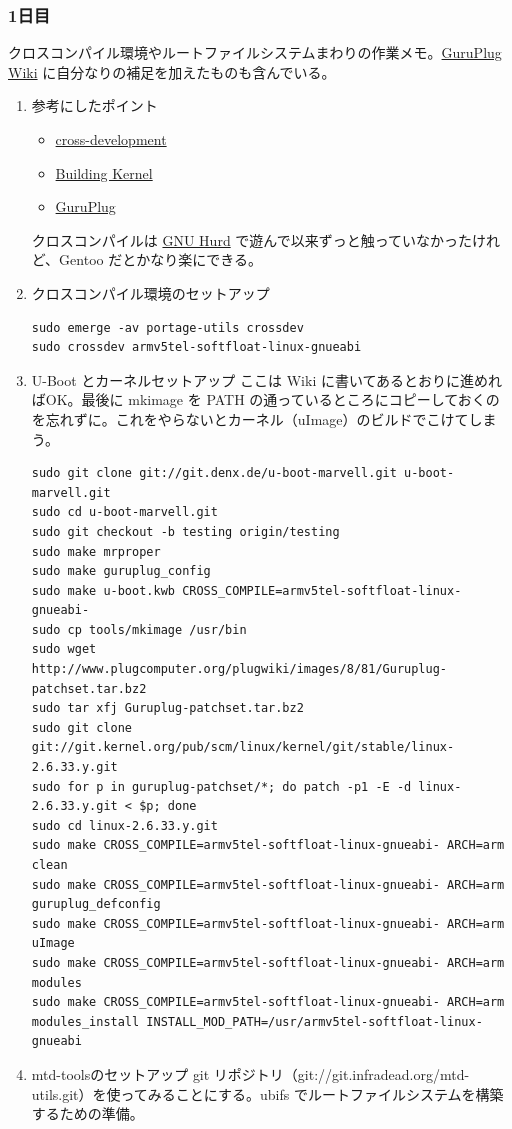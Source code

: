 \documentclass[11pt]{article}
\begin{document}
\subsubsection{1日目}
\label{sec:org42f26f9}
クロスコンパイル環境やルートファイルシステムまわりの作業メモ。\href{http://www.plugcomputer.org/plugwiki/index.php/GuruPlug\%22}{GuruPlug Wiki} に自分なりの補足を加えたものも含んでいる。
\begin{enumerate}
\item 参考にしたポイント
\label{sec:org939e62a}
\begin{itemize}
\item \href{http://www.gentoo.org/proj/en/base/embedded/cross-development.xml}{cross-development}
\item \href{http://computingplugs.com/index.php/Building\_a\_custom\_kernel}{Building
Kernel}
\item \href{http://www.plugcomputer.org/plugwiki/index.php/GuruPlug}{GuruPlug}
\end{itemize}

クロスコンパイルは \href{http://www.gnu.org/software/hurd/}{GNU Hurd} で遊んで以来ずっと触っていなかったけれど、Gentoo だとかなり楽にできる。
\item クロスコンパイル環境のセットアップ
\label{sec:orge3e42d4}
\begin{verbatim}
sudo emerge -av portage-utils crossdev
sudo crossdev armv5tel-softfloat-linux-gnueabi
\end{verbatim}
\item U-Boot とカーネルセットアップ
\label{sec:org1762c8f}
ここは Wiki に書いてあるとおりに進めればOK。最後に mkimage を PATH の通っているところにコピーしておくのを忘れずに。これをやらないとカーネル（uImage）のビルドでこけてしまう。

\begin{verbatim}
sudo git clone git://git.denx.de/u-boot-marvell.git u-boot-marvell.git
sudo cd u-boot-marvell.git
sudo git checkout -b testing origin/testing
sudo make mrproper
sudo make guruplug_config
sudo make u-boot.kwb CROSS_COMPILE=armv5tel-softfloat-linux-gnueabi-
sudo cp tools/mkimage /usr/bin
sudo wget http://www.plugcomputer.org/plugwiki/images/8/81/Guruplug-patchset.tar.bz2
sudo tar xfj Guruplug-patchset.tar.bz2
sudo git clone git://git.kernel.org/pub/scm/linux/kernel/git/stable/linux-2.6.33.y.git
sudo for p in guruplug-patchset/*; do patch -p1 -E -d linux-2.6.33.y.git < $p; done
sudo cd linux-2.6.33.y.git
sudo make CROSS_COMPILE=armv5tel-softfloat-linux-gnueabi- ARCH=arm clean
sudo make CROSS_COMPILE=armv5tel-softfloat-linux-gnueabi- ARCH=arm guruplug_defconfig
sudo make CROSS_COMPILE=armv5tel-softfloat-linux-gnueabi- ARCH=arm uImage
sudo make CROSS_COMPILE=armv5tel-softfloat-linux-gnueabi- ARCH=arm modules
sudo make CROSS_COMPILE=armv5tel-softfloat-linux-gnueabi- ARCH=arm modules_install INSTALL_MOD_PATH=/usr/armv5tel-softfloat-linux-gnueabi
\end{verbatim}
\item mtd-toolsのセットアップ
\label{sec:orgb71d386}
git リポジトリ（git://git.infradead.org/mtd-utils.git）を使ってみることにする。ubifs でルートファイルシステムを構築するための準備。


\end{enumerate}
\end{document}

